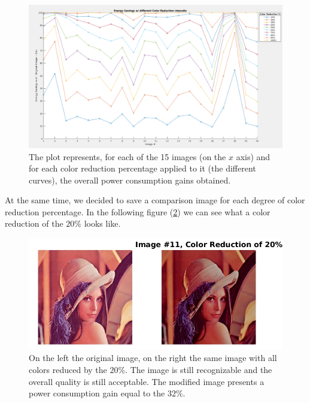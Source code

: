 \documentclass[a4paper]{article}
\begin{document}
            \begin{figure}[htp]
                \centering
                \includegraphics[width=1 \columnwidth]{./screenshots/ColorReductionOverall}
                \caption{
                        \label{fig:ColorReductionOverall}
                        The plot represents, for each of the 15 images (on the $x$ axis) and for each color reduction percentage applied to it (the different curves), the overall power consumption gains obtained.
                }
            \end{figure}

            At the same time, we decided to save a comparison image for each degree of color reduction percentage. In the following figure (\ref{fig:color_reduction_20perc_img_11}) we can see what a color reduction of the $20\%$ looks like.

            \begin{figure}[htp]
                \centering
                \includegraphics[width=0.6 \columnwidth]{./screenshots/color_reduction_20perc_img_11.jpg}
                \caption{
                        \label{fig:color_reduction_20perc_img_11}
                        On the left the original image, on the right the same image with all colors reduced by the $20\%$. The image is still recognizable and the overall quality is still acceptable. The modified image presents a power consumption gain equal to the $32\%$.
                }
            \end{figure}
\end{document}
